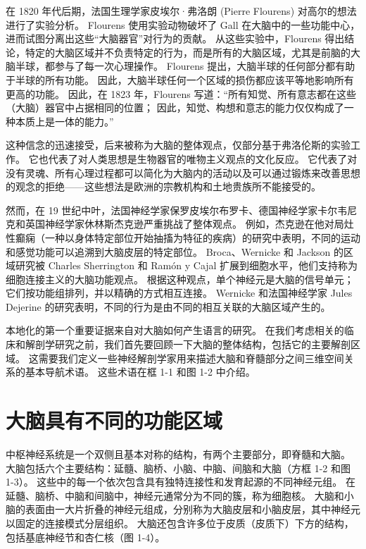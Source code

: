 在 1820 年代后期，法国生理学家皮埃尔·弗洛朗 (Pierre Flourens) 对高尔的想法进行了实验分析。 Flourens 使用实验动物破坏了 Gall 在大脑中的一些功能中心，进而试图分离出这些“大脑器官”对行为的贡献。 从这些实验中，Flourens 得出结论，特定的大脑区域并不负责特定的行为，而是所有的大脑区域，尤其是前脑的大脑半球，都参与了每一次心理操作。 Flourens 提出，大脑半球的任何部分都有助于半球的所有功能。 因此，大脑半球任何一个区域的损伤都应该平等地影响所有更高的功能。 因此，在 1823 年，Flourens 写道：“所有知觉、所有意志都在这些（大脑）器官中占据相同的位置； 因此，知觉、构想和意志的能力仅仅构成了一种本质上是一体的能力。”

这种信念的迅速接受，后来被称为大脑的整体观点，仅部分基于弗洛伦斯的实验工作。 它也代表了对人类思想是生物器官的唯物主义观点的文化反应。 它代表了对没有灵魂、所有心理过程都可以简化为大脑内的活动以及可以通过锻炼来改善思想的观念的拒绝——这些想法是欧洲的宗教机构和土地贵族所不能接受的。

然而，在 19 世纪中叶，法国神经学家保罗皮埃尔布罗卡、德国神经学家卡尔韦尼克和英国神经学家休林斯杰克逊严重挑战了整体观点。 例如，杰克逊在他对局灶性癫痫（一种以身体特定部位开始抽搐为特征的疾病）的研究中表明，不同的运动和感觉功能可以追溯到大脑皮层的特定部位。 Broca、Wernicke 和 Jackson 的区域研究被 Charles Sherrington 和 Ramón y Cajal 扩展到细胞水平，他们支持称为细胞连接主义的大脑功能观点。 根据这种观点，单个神经元是大脑的信号单元； 它们按功能组排列，并以精确的方式相互连接。 Wernicke 和法国神经学家 Jules Dejerine 的研究表明，不同的行为是由不同的相互关联的大脑区域产生的。

本地化的第一个重要证据来自对大脑如何产生语言的研究。 在我们考虑相关的临床和解剖学研究之前，我们首先要回顾一下大脑的整体结构，包括它的主要解剖区域。 这需要我们定义一些神经解剖学家用来描述大脑和脊髓部分之间三维空间关系的基本导航术语。 这些术语在框 1-1 和图 1-2 中介绍。


\section{大脑具有不同的功能区域}

中枢神经系统是一个双侧且基本对称的结构，有两个主要部分，即脊髓和大脑。 大脑包括六个主要结构：延髓、脑桥、小脑、中脑、间脑和大脑（方框 1-2 和图 1-3）。 这些中的每一个依次包含具有独特连接性和发育起源的不同神经元组。 在延髓、脑桥、中脑和间脑中，神经元通常分为不同的簇，称为细胞核。 大脑和小脑的表面由一大片折叠的神经元组成，分别称为大脑皮层和小脑皮层，其中神经元以固定的连接模式分层组织。 大脑还包含许多位于皮质（皮质下）下方的结构，包括基底神经节和杏仁核（图 1-4）。

